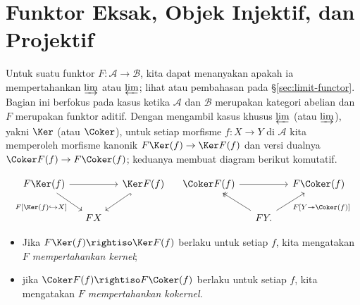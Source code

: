 
\section{Funktor Eksak, Objek Injektif, dan Projektif}\label{sec:inj-proj}
\hypertarget{o014.aljabr2.chapter2.exact-functors-injective-projective-objects}{ }

Untuk suatu funktor $F: \mathcal{A} \to \mathcal{B}$, kita dapat menanyakan apakah
ia mempertahankan $\varinjlim$ atau $\varprojlim$; lihat \cite[\S 2.8]{Li1} atau
pembahasan pada \S\ref{sec:limit-functor}. Bagian ini berfokus pada kasus ketika
$\mathcal{A}$ dan $\mathcal{B}$ merupakan kategori abelian dan $F$ merupakan funktor
aditif. Dengan mengambil kasus khusus $\varprojlim$ (atau $\varinjlim$), yakni
$\Ker$ (atau $\Coker$), untuk setiap morfisme $f:X\to Y$ di $\mathcal{A}$ kita
memperoleh morfisme kanonik $F\Ker(f)\to\Ker F(f)$ dan versi dualnya
$\Coker F(f)\to F\Coker(f)$; keduanya membuat diagram berikut komutatif.

\[\begin{tikzcd}[column sep=small]
	F \Ker(f) \arrow[rd, "{F[\Ker(f) \hookrightarrow X]}"'] \arrow[rr] & & \Ker F(f) \arrow[hookrightarrow, ld] \\
	& FX &
\end{tikzcd} \quad \begin{tikzcd}[column sep=small]
	\Coker F(f) \arrow[rr] & & F \Coker(f) \\
	& FY \arrow[twoheadrightarrow, lu] \arrow[ru, "{ F[Y \twoheadrightarrow \Coker(f)] }"'] . &
\end{tikzcd}\]

\begin{itemize}
	\item Jika $F\Ker(f)\rightiso\Ker F(f)$ berlaku untuk setiap $f$, kita mengatakan
	\emph{$F$ mempertahankan kernel};
	\item jika $\Coker F(f)\rightiso F\Coker(f)$ berlaku untuk setiap $f$, kita mengatakan
	\emph{$F$ mempertahankan kokernel}.
\end{itemize}

